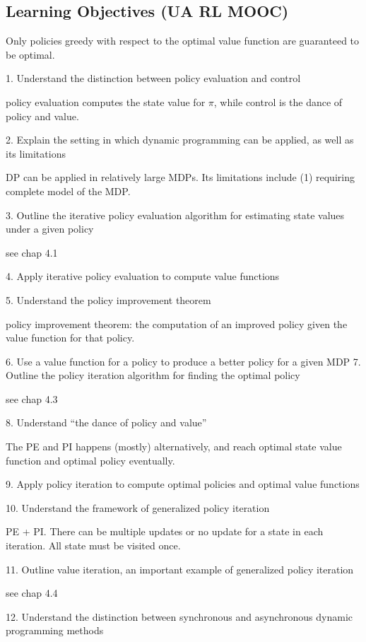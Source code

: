 \documentclass[sutton_barto_notes.tex]{subfiles}
\begin{document}
\newpage
\subsection{Learning Objectives (UA RL MOOC)}

Only policies greedy with respect to the optimal value function are guaranteed to be optimal.

1. Understand the distinction between policy evaluation and control

policy evaluation computes the state value for $\pi$, while control is the dance of policy and value.

2. Explain the setting in which dynamic programming can be applied, as well as its limitations

DP can be applied in relatively large MDPs. Its limitations include (1) requiring complete model of the MDP.

3. Outline the iterative policy evaluation algorithm for estimating state values under a given policy

see chap 4.1

4. Apply iterative policy evaluation to compute value functions

5. Understand the policy improvement theorem

policy improvement theorem: the computation of an improved policy given the value function for that policy.

6. Use a value function for a policy to produce a better policy for a given MDP
7. Outline the policy iteration algorithm for finding the optimal policy

see chap 4.3

8. Understand “the dance of policy and value”

The PE and PI happens (mostly) alternatively, and reach optimal state value function and optimal policy eventually.

9. Apply policy iteration to compute optimal policies and optimal value functions

10. Understand the framework of generalized policy iteration

PE + PI. There can be multiple updates or no update for a state in each iteration. All state must be visited once.

11. Outline value iteration, an important example of generalized policy iteration

see chap 4.4

12. Understand the distinction between synchronous and asynchronous dynamic programming methods
\end{document}
